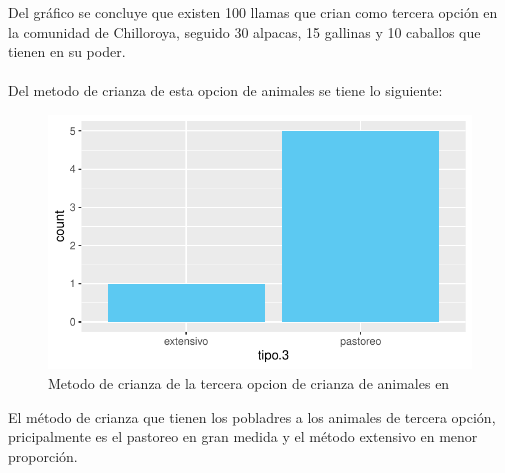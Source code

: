 \documentclass[12pt]{article}\usepackage[]{graphicx}\usepackage[]{xcolor}
\makeatletter
\def\maxwidth{ %
  \ifdim\Gin@nat@width>\linewidth
    \linewidth
  \else
    \Gin@nat@width
  \fi
}
\newenvironment{knitrout}{}{} %
\makeatother
\begin{document}
	Del gráfico se concluye que existen 100 llamas que crian como tercera opción en la comunidad de Chilloroya, seguido 30 alpacas, 15 gallinas y 10 caballos que tienen en su poder.\\
	\\
	Del metodo de crianza de esta opcion de animales se tiene lo siguiente:
	\begin{figure}[H]
	\centering
\begin{knitrout}
\color{fgcolor}
\includegraphics[width=\maxwidth]{figure/twenty_three-1} 
\end{knitrout}
	\caption{Metodo de crianza de la tercera opcion de crianza de animales en \comunidad}
	\end{figure}
	El método de crianza que tienen los pobladres a los animales de tercera opción, pricipalmente es el pastoreo en gran medida y el método extensivo en menor proporción.\\
	
	
\end{document}
